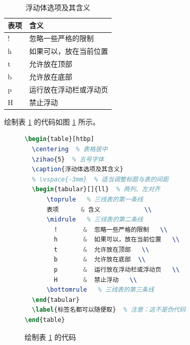 \begin{table}[htbp]
  \centering  %
  \caption{浮动体选项及其含义}
  \begin{tabular}[]{ll}
      \toprule   %
      表项      & 含义            \\
      \midrule   %
        !       &  忽略一些严格的限制   \\
        h       &  如果可以，放在当前位置   \\
        t       &  允许放在顶部   \\
        b       &  允许放在底部  \\
        p       &  运行放在浮动栏或浮动页   \\
        H       &  禁止浮动   \\
      \bottomrule   %
  \end{tabular}
  \label{标签名都可以随便取}  %
\end{table}

绘制表 \ref{标签名都可以随便取} 的代码如图 \ref{fig.tablecode} 所示。

\begin{figure}[htbp]
  \centering
  \begin{minipage}{8cm}
  \begin{lstlisting}[language=TeX]
\begin{table}[htbp]
  \centering  % 表格居中
  \zihao{5}  % 五号字体
  \caption{浮动体选项及其含义}
  % \vspace{-3mm}  % 适当调整标题与表的间距
  \begin{tabular}[]{ll}  % 两列、左对齐
      \toprule   % 三线表的第一条线
      表项      & 含义            \\
      \midrule   % 三线表的第二条线
        !       &  忽略一些严格的限制   \\
        h       &  如果可以，放在当前位置   \\
        t       &  允许放在顶部   \\
        b       &  允许放在底部  \\
        p       &  运行放在浮动栏或浮动页   \\
        H       &  禁止浮动   \\
      \bottomrule   % 三线表的第三条线
  \end{tabular}
  \label{标签名都可以随便取}  % 注意：这不是伪代码
\end{table}
  \end{lstlisting}
  \end{minipage}
  \caption{绘制表 \ref{标签名都可以随便取} 的代码}
  \label{fig.tablecode}
\end{figure}

